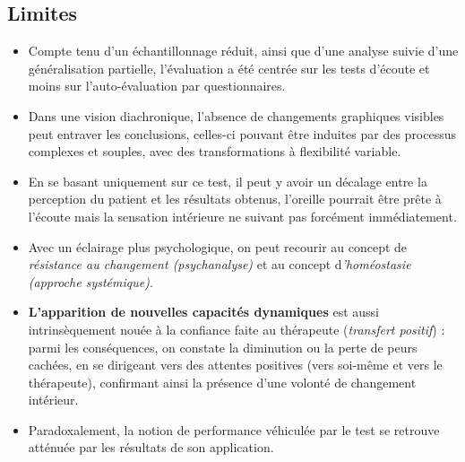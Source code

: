 \subsection{Limites}


  \begin{itemize}
  
\item Compte tenu  d'un échantillonnage réduit, ainsi que d'une analyse
  suivie d'une généralisation partielle, l'évaluation a été centrée sur les
  tests d'écoute et moins sur
  l'auto-évaluation par questionnaires.

\item   Dans une vision diachronique, l'absence de changements graphiques
 visibles 
 peut  entraver les conclusions, celles-ci pouvant être 
 induites par des processus complexes et souples, avec des
 transformations à flexibilité variable.
\item En se basant uniquement sur ce test, il peut y avoir un décalage entre
la perception du patient et les résultats obtenus, l'oreille pourrait
être prête à l'écoute mais la sensation intérieure ne suivant pas
forcément immédiatement.


\item Avec un éclairage plus psychologique, on peut recourir au concept de
\textit{résistance au changement (psychanalyse)} et au concept
d\textit{'homéostasie (approche systémique)}.

\item \textbf{L'apparition de nouvelles
capacités  dynamiques }est aussi intrinsèquement nouée à la confiance
faite au thérapeute (\textit{transfert positif})
\autocite{roustang1986} : parmi les conséquences, on constate la
diminution ou la perte de peurs cachées,  en se dirigeant vers des
attentes positives (vers soi-même et vers le thérapeute), confirmant ainsi la
présence d'une volonté de changement intérieur.

\item Paradoxalement, la notion de performance véhiculée par le test se
  retrouve atténuée par les résultats de son application.
  \end{itemize}





